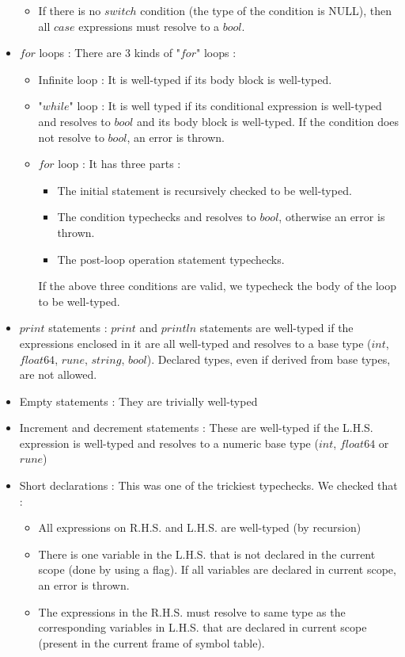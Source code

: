 \documentclass[preprint,12pt]{elsarticle}
\begin{document}
\begin{itemize}
\begin{itemize}
\item If there is no $switch$ condition (the type of the condition is NULL), then all $case$ expressions must resolve to a $bool$.
\end{itemize}
\item $for$ loops : 
There are 3 kinds of "$for$" loops : 
\begin{itemize}
\item Infinite loop : It is well-typed if its body block is well-typed.
\item "$while$" loop : It is well typed if its conditional expression is well-typed and resolves to $bool$ and its body block is well-typed. If the condition does not resolve to $bool$, an error is thrown.
\item $for$ loop : It has three parts : 
\begin{itemize}
\item The initial statement is recursively checked to be well-typed.
\item The condition typechecks and resolves to $bool$, otherwise an error is thrown.
\item The post-loop operation statement typechecks.
\end{itemize}
If the above three conditions are valid, we typecheck the body of the loop to be well-typed.
\end{itemize}
\item $print$ statements : $print$ and $println$ statements are well-typed if the expressions enclosed in it are all well-typed and resolves to a base type ($int$, $float64$, $rune$, $string$, $bool$). Declared types, even if derived from base types, are not allowed.
\item Empty statements : They are trivially well-typed
\item Increment and decrement statements : These are well-typed if the L.H.S. expression is well-typed and resolves to a numeric base type ($int$, $float64$ or $rune$)
\item Short declarations : This was one of the trickiest typechecks. We checked that : 
\begin{itemize}
\item All expressions on R.H.S. and L.H.S. are well-typed (by recursion)
\item There is one variable in the L.H.S. that is not declared in the current scope (done by using a flag). If all variables are declared in current scope, an error is thrown.
\item The expressions in the R.H.S. must resolve to same type as the corresponding variables in L.H.S. that are declared in current scope (present in the current frame of symbol table).

\end{itemize}
\end{itemize}
\end{document}

